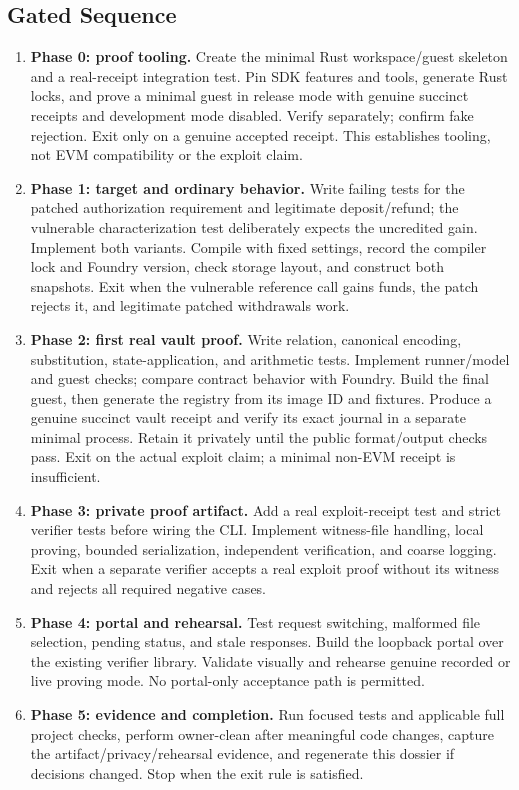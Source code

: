 \documentclass[11pt]{article}
\begin{document}
\subsection{Gated Sequence}
\begin{enumerate}
\item \textbf{Phase 0: proof tooling.} Create the minimal Rust workspace/guest skeleton and a real-receipt integration test. Pin SDK features and tools, generate Rust locks, and prove a minimal guest in release mode with genuine succinct receipts and development mode disabled. Verify separately; confirm fake rejection. Exit only on a genuine accepted receipt. This establishes tooling, not EVM compatibility or the exploit claim.
\item \textbf{Phase 1: target and ordinary behavior.} Write failing tests for the patched authorization requirement and legitimate deposit/refund; the vulnerable characterization test deliberately expects the uncredited gain. Implement both variants. Compile with fixed settings, record the compiler lock and Foundry version, check storage layout, and construct both snapshots. Exit when the vulnerable reference call gains funds, the patch rejects it, and legitimate patched withdrawals work.
\item \textbf{Phase 2: first real vault proof.} Write relation, canonical encoding, substitution, state-application, and arithmetic tests. Implement runner/model and guest checks; compare contract behavior with Foundry. Build the final guest, then generate the registry from its image ID and fixtures. Produce a genuine succinct vault receipt and verify its exact journal in a separate minimal process. Retain it privately until the public format/output checks pass. Exit on the actual exploit claim; a minimal non-EVM receipt is insufficient.
\item \textbf{Phase 3: private proof artifact.} Add a real exploit-receipt test and strict verifier tests before wiring the CLI. Implement witness-file handling, local proving, bounded serialization, independent verification, and coarse logging. Exit when a separate verifier accepts a real exploit proof without its witness and rejects all required negative cases.
\item \textbf{Phase 4: portal and rehearsal.} Test request switching, malformed file selection, pending status, and stale responses. Build the loopback portal over the existing verifier library. Validate visually and rehearse genuine recorded or live proving mode. No portal-only acceptance path is permitted.
\item \textbf{Phase 5: evidence and completion.} Run focused tests and applicable full project checks, perform owner-clean after meaningful code changes, capture the artifact/privacy/rehearsal evidence, and regenerate this dossier if decisions changed. Stop when the exit rule is satisfied.
\end{enumerate}
\end{document}
